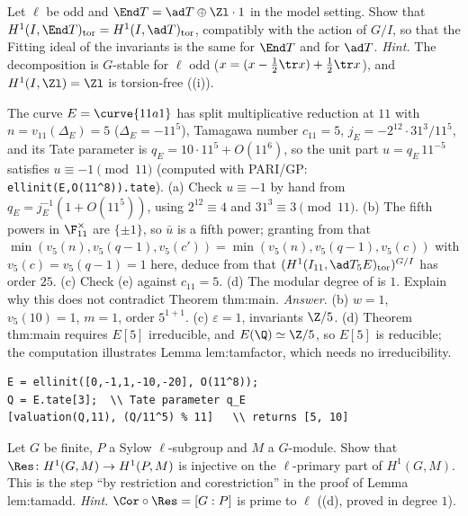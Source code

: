 \begin{exercise}\label{ex:cohomology:end}
Let $\ell$ be odd and $\End T=\ad T\oplus\Zl\cdot1$ in the model setting. Show that $H^1(I,\End T)_{\mathrm{tor}}=H^1(I,\ad T)_{\mathrm{tor}}$, compatibly with the action of $G/I$, so
that the Fitting ideal of the invariants is the same for $\End T$ and for $\ad T$.
\emph{Hint.} The decomposition is $G$-stable for $\ell$ odd ($x=(x-\frac12\tr x)+\frac12\tr x$), and $H^1(I,\Zl)=\Zl$ is torsion-free ((i)).
\end{exercise}

\begin{exercise}[the curve \curve{11a1} at $q=11$, $\ell=5$]\label{ex:cohomology:11a1}
The curve $E=\curve{11a1}$ has split multiplicative reduction at $11$ with $n=v_{11}(\Delta_E)=5$ ($\Delta_E=-11^5$), Tamagawa number $c_{11}=5$, $j_E=-2^{12}\cdot31^3/11^5$, and its Tate parameter
is $q_E=10\cdot11^5+O(11^6)$, so the unit part $u=q_E\,11^{-5}$ satisfies $u\equiv-1\pmod{11}$ (computed with PARI/GP: \texttt{ellinit(E,O(11\^{}8)).tate}). (a) Check
$u\equiv-1$ by hand from $q_E=j_E^{-1}(1+O(11^5))$, using $2^{12}\equiv4$ and $31^3\equiv3\pmod{11}$. (b) The fifth powers in $\F_{11}^\times$ are $\{\pm1\}$, so $\bar u$ is a fifth power; granting
from  that $\min(v_5(n),v_5(q-1),v_5(c'))=\min(v_5(n),v_5(q-1),v_5(c))$ with $v_5(c)=v_5(q-1)=1$ here, deduce from  that
$(H^1(I_{11},\ad T_5E)_{\mathrm{tor}})^{G/I}$ has order $25$. (c) Check (e) against $c_{11}=5$. (d) The modular degree of  is $1$. Explain why this does not
contradict Theorem thm:main.
\emph{Answer.} (b) $w=1$, $v_5(10)=1$, $m=1$, order $5^{1+1}$. (c) $\varepsilon=1$, invariants $\Z/5$. (d) Theorem thm:main requires $E[5]$ irreducible, and $E(\Q)\simeq\Z/5$, so $E[5]$
is reducible; the computation illustrates Lemma lem:tamfactor, which needs no irreducibility.
\begin{lstlisting}[language=GP]
E = ellinit([0,-1,1,-10,-20], O(11^8));
Q = E.tate[3];  \\ Tate parameter q_E
[valuation(Q,11), (Q/11^5) % 11]   \\ returns [5, 10]
\end{lstlisting}
\end{exercise}

\begin{exercise}\label{ex:cohomology:sylow}
Let $G$ be finite, $P$ a Sylow $\ell$-subgroup and $M$ a $G$-module. Show that $\Res\colon H^1(G,M)\to H^1(P,M)$ is injective on the $\ell$-primary part of $H^1(G,M)$. This is the
step ``by restriction and corestriction'' in the proof of Lemma lem:tamadd.
\emph{Hint.} $\Cor\circ\Res=[G:P]$ is prime to $\ell$ ((d), proved in degree $1$).
\end{exercise}

